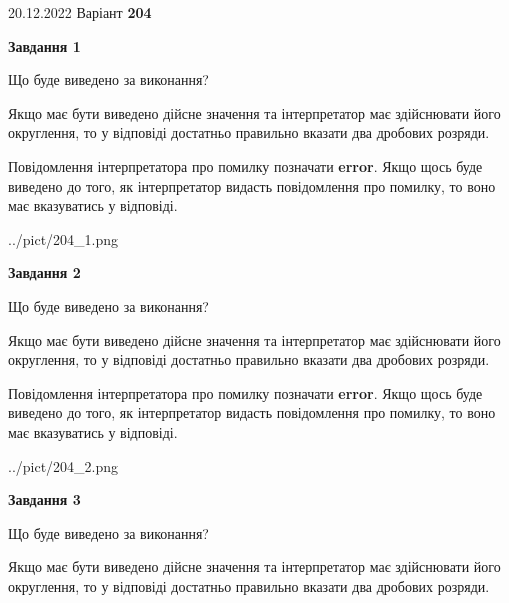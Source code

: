 \documentclass[12pt, ukrainian]{article}
\begin{document}
{20.12.2022 Варіант \No \textbf { 204 }\par}
{
\begin {Large}

{\begin {center}\textbf{Завдання 1}\end {center}}\par
Що буде виведено за виконання? \par

Якщо має бути виведено дійсне значення та інтерпретатор має здійснювати його округлення, 
то у відповіді достатньо правильно вказати два дробових розряди.

Повідомлення інтерпретатора про помилку позначати \textbf{error}.
Якщо щось буде виведено до того, як інтерпретатор видасть повідомлення про помилку, 
то воно має вказуватись у відповіді. \par

\begin{center}
	{../pict/204_1.png}
\end{center}
\newpage

{\begin {center}\textbf{Завдання 2}\end {center}}\par
Що буде виведено за виконання? \par

Якщо має бути виведено дійсне значення та інтерпретатор має здійснювати його округлення, 
то у відповіді достатньо правильно вказати два дробових розряди.

Повідомлення інтерпретатора про помилку позначати \textbf{error}.
Якщо щось буде виведено до того, як інтерпретатор видасть повідомлення про помилку, 
то воно має вказуватись у відповіді. \par

\begin{center}
	{../pict/204_2.png}
\end{center}
\newpage

{\begin {center}\textbf{Завдання 3}\end {center}}\par
Що буде виведено за виконання? \par

Якщо має бути виведено дійсне значення та інтерпретатор має здійснювати його округлення, 
то у відповіді достатньо правильно вказати два дробових розряди.


\end{Large}}
\end{document}
